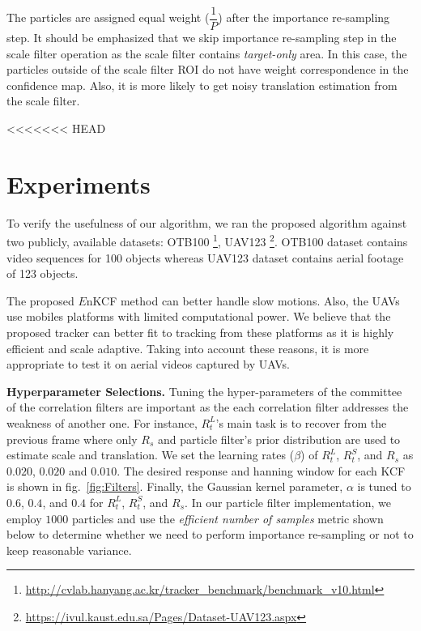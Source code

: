 \documentclass{bmvc2k}
\begin{document}
The particles are assigned equal weight ($\dfrac{1}{P}$) after the
importance re-sampling step. It should be emphasized that we skip
importance re-sampling step in the scale filter operation as the scale
filter contains \textit{target-only} area. In this case, the particles
outside of the scale filter ROI do not have weight correspondence in
the confidence map. Also, it is more likely to get noisy translation
estimation from the scale filter.

<<<<<<< HEAD
\section{Experiments} \label{sc:Experiments}
To verify the usefulness of our algorithm, we ran the proposed
algorithm against two publicly, available datasets:
OTB100 \footnote{\url{http://cvlab.hanyang.ac.kr/tracker_benchmark/benchmark_v10.html}},
UAV123 \footnote{\url{https://ivul.kaust.edu.sa/Pages/Dataset-UAV123.aspx}}\cite{mueller2016uav123}. OTB100
dataset contains video sequences for 100 objects whereas UAV123
dataset contains aerial footage of 123 objects. 

The proposed $E$nKCF method can better handle slow motions. Also, the
UAVs use mobiles platforms with limited computational power. We
believe that the proposed tracker can better fit to tracking from
these platforms as it is highly efficient and scale adaptive. Taking
into account these reasons, it is more appropriate to test it on
aerial videos captured by UAVs.

\textbf{Hyperparameter Selections.} Tuning the hyper-parameters of the
committee of the correlation filters are important as the each
correlation filter addresses the weakness of another one. For
instance, $R_{t}^{L}$'s main task is to recover from the previous
frame where only $R_{s}$ and particle filter's prior distribution are
used to estimate scale and translation. We set the learning rates
($\beta$) of $R_{t}^{L}$, $R_{t}^{S}$, and $R_{s}$ as $0.020$, $0.020$
and $0.010$. The desired response and hanning window for each KCF is
shown in fig.~\ref{fig:Filters}. Finally, the Gaussian kernel
parameter, $\alpha$ is tuned to $0.6$, $0.4$, and $0.4$ for
$R_{t}^{L}$, $R_{t}^{S}$, and $R_{s}$. In our particle filter
implementation, we employ $1000$ particles and use the
\textit{efficient number of samples} metric shown below to determine
whether we need to perform importance re-sampling or not to keep
reasonable variance.
\end{document}
